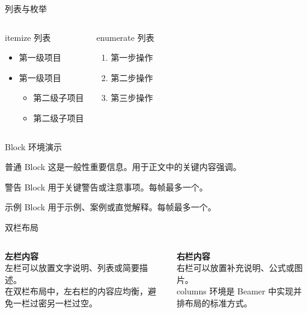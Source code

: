 \documentclass[aspectratio=169, 11pt]{beamer}
\begin{document}
\begin{frame}{列表与枚举}
\begin{columns}
\begin{block}{itemize 列表}
  \begin{itemize}
    \item 第一级项目
    \item 第一级项目
    \begin{itemize}
      \item 第二级子项目
      \item 第二级子项目
    \end{itemize}
  \end{itemize}
\end{block}

\begin{block}{enumerate 列表}
  \begin{enumerate}
    \item 第一步操作
    \item 第二步操作
    \item 第三步操作
  \end{enumerate}
\end{block}
\end{columns}
\end{frame}

\begin{frame}{Block 环境演示}
\begin{block}{普通 Block}
  这是一般性重要信息。用于正文中的关键内容强调。
\end{block}

\vspace{0.3cm}

\begin{alertblock}{警告 Block}
  用于关键警告或注意事项。每帧最多一个。
\end{alertblock}

\vspace{0.3cm}

\begin{exampleblock}{示例 Block}
  用于示例、案例或直觉解释。每帧最多一个。
\end{exampleblock}
\end{frame}

\begin{frame}{双栏布局}
\begin{columns}
\centering
\textbf{左栏内容}\\
\vspace{0.3cm}
\footnotesize
左栏可以放置文字说明、列表或简要描述。\\
在双栏布局中，左右栏的内容应均衡，避免一栏过密另一栏过空。

\centering
\textbf{右栏内容}\\
\vspace{0.3cm}
\footnotesize
右栏可以放置补充说明、公式或图片。\\
columns 环境是 Beamer 中实现并排布局的标准方式。
\end{columns}
\end{frame}
\end{document}
